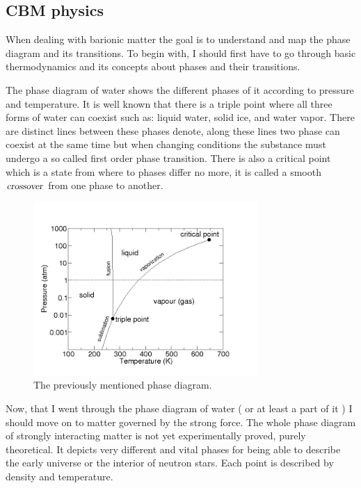 \documentclass[a4paper,12pt]{article}
\begin{document}
\subsection{ CBM physics }
\vspace{5mm}
\par When dealing with barionic matter the goal is to understand and map the phase diagram and its transitions. To begin with, I should first have to go through basic thermodynamics and its concepts about phases and their transitions.
\vspace{5mm}
\par The phase diagram of water shows the different phases of it according to pressure and temperature. It is well known that there is a triple point where all three forms of water can coexist such as: liquid water,  solid ice, and water vapor. There are distinct lines between these phases denote, along these lines two phase can coexist at the same time but when changing conditions  the substance must undergo a so called first order phase transition. There is also a critical point which is a state from where to phases differ no more, it is called a smooth $\textsl{crossover}$ from one phase to another.
\begin{figure}[H]
\centering
\includegraphics[width=0.76\textwidth]{water_phase.jpg}
\caption{ The previously mentioned phase diagram. }
\end{figure}
\par Now, that I went through the phase diagram of water ( or at least a part of it ) I should move on to matter governed by the strong force. The whole phase diagram of strongly interacting matter is not yet experimentally proved, purely theoretical. It depicts very different and vital phases for being able to describe the early universe or the interior of neutron stars. Each point is described by density and temperature.
\end{document}
